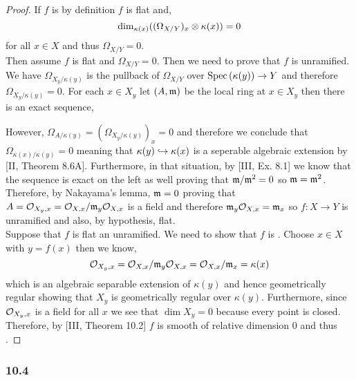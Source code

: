 \documentclass[12pt]{article}
\begin{document}
\begin{proof}
If $f$ is \etale by definition $f$ is flat and,
\[ \dim_{\kappa(x)}((\Omega_{X/Y})_x \otimes \kappa(x)) = 0 \]
for all $x \in X$ and thus $\Omega_{X/Y} = 0$.
\bigskip\\
Then assume $f$ is flat and $\Omega_{X/Y} = 0$. Then we need to prove that $f$ is unramified. We have $\Omega_{X_y / \kappa(y)}$ is the pullback of $\Omega_{X/Y}$ over $\mathrm{Spec}\left( \kappa(y) \right) \to Y$ and therefore $\Omega_{X_y / \kappa(y)} = 0$. For each $x \in X_y$ let $(A, \mathfrak{m})$ be the local ring at $x \in X_y$ then there is an exact sequence,
\begin{center}
\end{center}
However, $\Omega_{A/\kappa(y)} = (\Omega_{X_y / \kappa(y)})_x = 0$ and therefore we conclude that $\Omega_{\kappa(x)/\kappa(y)} = 0$ meaning that $\kappa(y) \hookrightarrow \kappa(x)$ is a seperable algebraic extension by [II, Theorem 8.6A]. Furthermore, in that situation, by [III, Ex. 8.1] we know that the sequence is exact on the left as well proving that $\mathfrak{m} / \mathfrak{m}^2 = 0$ so $\mathfrak{m} = \mathfrak{m}^2$. Therefore, by Nakayama's lemma, $\mathfrak{m} = 0$ proving that $A = \mathcal{O}_{X_y, x} = \mathcal{O}_{X, x} / \mathfrak{m}_y \mathcal{O}_{X, x}$ is a field and therefore $\mathfrak{m}_y \mathcal{O}_{X, x} = \mathfrak{m}_x$ so $f : X \to Y$ is unramified and also, by hypothesis, flat. 
\bigskip\\
Suppose that $f$ is flat an unramified. We need to show that $f$ is \etale. Choose $x \in X$ with $y = f(x)$ then we know,
\[ \mathcal{O}_{X_y, x} = \mathcal{O}_{X, x} / \mathfrak{m}_y \mathcal{O}_{X, x} = \mathcal{O}_{X, x} / \mathfrak{m}_x = \kappa(x) \]
which is an algebraic separable extension of $\kappa(y)$ and hence geometrically regular showing that $X_y$ is geometrically regular over $\kappa(y)$. Furthermore, since $\mathcal{O}_{X_y, x}$ is a field for all $x$ we see that $\dim{X_y} = 0$ because every point is closed. Therefore, by [III, Theorem 10.2] $f$ is smooth of relative dimension $0$ and thus \etale. 
\end{proof}

\subsubsection{10.4}
\end{document}
